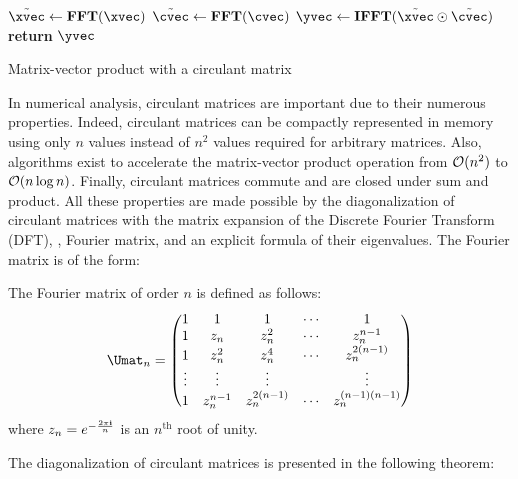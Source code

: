 \begin{algorithm}[htb]
  \begin{algorithmic}[1]
     
      \State $\tilde{\xvec} \gets \textbf{FFT}(\xvec)$
      \State $\tilde{\cvec} \gets \textbf{FFT}(\cvec)$
      \State $\yvec \gets \textbf{IFFT}(\tilde{\xvec} \odot \tilde{\cvec})$ 
      \State \textbf{return} $\yvec$ 
    \EndProcedure
  \end{algorithmic}
  \caption{Matrix-vector product with a circulant matrix}
  \label{algorithm:ch2-matrix_vector_product_circulant_matrix}
\end{algorithm}

In numerical analysis, circulant matrices are important due to their numerous properties.
Indeed, circulant matrices can be compactly represented in memory using only $n$ values instead of $n^2$ values required for arbitrary matrices.
Also, algorithms exist to accelerate the matrix-vector product operation from $\mathcal{O}(n^2)$ to $\mathcal{O}(n \log n)$. 
Finally, circulant matrices commute and are closed under sum and product.
All these properties are made possible by the diagonalization of circulant matrices with the matrix expansion of the Discrete Fourier Transform (DFT), \ie, Fourier matrix, and an explicit formula of their eigenvalues.
The Fourier matrix is of the form:
\begin{definition}
  The Fourier matrix of order $n$ is defined as follows:
  \begin{equation} \label{definition:ch2-fourier_matrix}
    \Umat_n = 
    \leftmatrix
      1      & 1         & 1            & \cdots & 1                \\
      1      & z_n       & z_n^2        & \cdots & z_n^{n-1}        \\
      1      & z_n^2     & z_n^4        & \cdots & z_n^{2(n-1)}     \\
      \vdots & \vdots    & \vdots       &        & \vdots           \\
      1      & z_n^{n-1} & z_n^{2(n-1)} & \cdots & z_n^{(n-1)(n-1)}
    \rightmatrix
  \end{equation}
  where $z_n = e^{-\frac{2\pi\mathbf{i}}{n}}$ is an $n^{\text{th}}$ root of unity.
\end{definition}
\noindent
The diagonalization of circulant matrices is presented in the following theorem:
